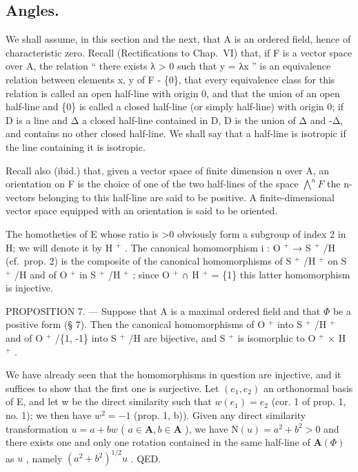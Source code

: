 \subsection{Angles.}

We shall assume, in this section and the next, that A is an ordered field, hence of characteristic zero. Recall (Rectifications to Chap.~VI) that, if F is a vector space over A, the relation “ there exists λ \textgreater{} 0 such that y = λx ” is an equivalence relation between elements x, y of F - \{0\}, that every equivalence class for this relation is called an open half-line with origin 0, and that the union of an open half-line and \{0\} is called a closed half-line (or simply half-line) with origin 0; if D is a line and Δ a closed half-line contained in D, D is the union of Δ and -Δ, and contains no other closed half-line. We shall say that a half-line is isotropic if the line containing it is isotropic.

Recall also (ibid.) that, given a vector space of finite dimension n over A, an orientation on F is the choice of one of the two half-lines of the space \(\bigwedge^{n}F\) the n-vectors belonging to this half-line are said to be positive. A finite-dimensional vector space equipped with an orientation is said to be oriented.

The homotheties of E whose ratio is \textgreater0 obviously form a subgroup of index 2 in H; we will denote it by H \(^{+}\) . The canonical homomorphism i : O \(^{+}\) → S \(^{+}\) /H (cf.~prop. 2) is the composite of the canonical homomorphisms of S \(^{+}\) /H \(^{+}\) on S \(^{+}\) /H and of O \(^{+}\) in S \(^{+}\) /H \(^{+}\) ; since O \(^{+}\) ∩ H \(^{+}\) = \{1\} this latter homomorphism is injective.

PROPOSITION 7. --- Suppose that A is a maximal ordered field and that \(\Phi\) be a positive form (§ 7). Then the canonical homomorphisms of O \(^{+}\) into S \(^{+}\) /H \(^{+}\) and of O \(^{+}\) /\{1, -1\} into S \(^{+}\) /H are bijective, and S \(^{+}\) is isomorphic to O \(^{+}\) × H \(^{+}\) .

We have already seen that the homomorphisms in question are injective, and it suffices to show that the first one is surjective. Let \((e_{1}, e_{2})\) an orthonormal basis of E, and let w be the direct similarity such that \(w(e_{1}) = e_{2}\) (cor. 1 of prop. 1, no. 1); we then have \(w^{2} = -1\) (prop. 1, b)). Given any direct similarity transformation \(u = a + bw\) ( \(a \in \mathbf{A}, b \in \mathbf{A}\) ), we have \(\mathrm{N}(u) = a^2 + b^2 > 0\) and there exists one and only one rotation contained in the same half-line of \(\mathbf{A}(\Phi)\) as \(u\) , namely \((a^2 + b^2)^{1/2} u\) . QED.

